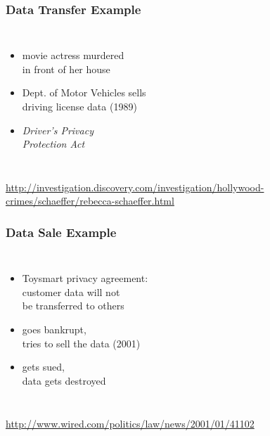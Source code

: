 \documentclass[dvipsnames]{beamer}
\theoremstyle{plain}
\begin{document}
\begin{frame}
  \frametitle{Data Transfer Example}

  \begin{columns}

    \begin{itemize}
      \item movie actress murdered\\
        in front of her house
      \item Dept. of Motor Vehicles sells\\
        driving license data (1989)

      \medskip
      \item \emph{Driver's Privacy\\
        Protection Act}
    \end{itemize}
  \end{columns}

  \medskip
  \tiny{\url{http://investigation.discovery.com/investigation/hollywood-crimes/schaeffer/rebecca-schaeffer.html}}\\
\end{frame}

\begin{frame}
  \frametitle{Data Sale Example}

  \begin{columns}

    \begin{itemize}
      \item Toysmart privacy agreement:\\
        customer data will not\\
        be transferred to others
      \item goes bankrupt,\\
        tries to sell the data (2001)
      \item gets sued,\\
        data gets destroyed
    \end{itemize}
  \end{columns}

  \medskip
  \tiny{\url{http://www.wired.com/politics/law/news/2001/01/41102}}\\
\end{frame}
\end{document}
